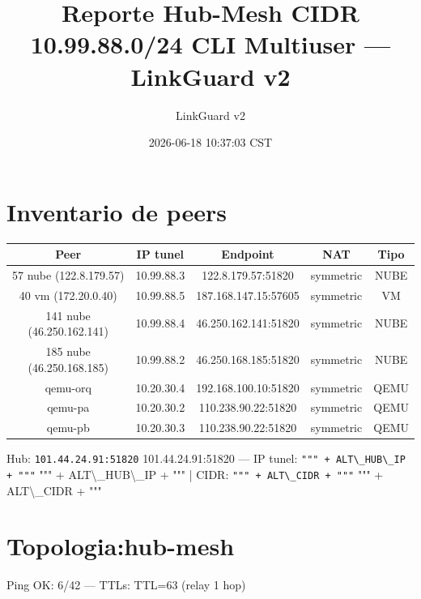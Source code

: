 \documentclass[11pt,a4paper]{article}
\title{Reporte Hub-Mesh CIDR 10.99.88.0/24 CLI Multiuser — LinkGuard v2}
\author{LinkGuard v2}
\date{2026-06-18 10:37:03 CST}
\begin{document}
\maketitle

\section{Inventario de peers}
\begin{longtable}{|c|c|c|c|c|}
\hline
Peer & IP tunel & Endpoint & NAT & Tipo \\ \hline
57 nube (122.8.179.57) & 10.99.88.3 & 122.8.179.57:51820 & symmetric & NUBE \\ \hline
40 vm (172.20.0.40) & 10.99.88.5 & 187.168.147.15:57605 & symmetric & VM \\ \hline
141 nube (46.250.162.141) & 10.99.88.4 & 46.250.162.141:51820 & symmetric & NUBE \\ \hline
185 nube (46.250.168.185) & 10.99.88.2 & 46.250.168.185:51820 & symmetric & NUBE \\ \hline
qemu-orq & 10.20.30.4 & 192.168.100.10:51820 & symmetric & QEMU \\ \hline
qemu-pa & 10.20.30.2 & 110.238.90.22:51820 & symmetric & QEMU \\ \hline
qemu-pb & 10.20.30.3 & 110.238.90.22:51820 & symmetric & QEMU \\ \hline
\end{longtable}

Hub:  \texttt{101.44.24.91:51820} 101.44.24.91:51820  — IP tunel:  \texttt{""" + ALT\textbackslash{}_HUB\textbackslash{}_IP + """} """ + ALT\textbackslash{}_HUB\textbackslash{}_IP + """  | CIDR:  \texttt{""" + ALT\textbackslash{}_CIDR + """} """ + ALT\textbackslash{}_CIDR + """\\

\section{Topologia:hub-mesh}
Ping OK: 6/42 — TTLs: TTL=63 (relay 1 hop)\\
\end{document}
